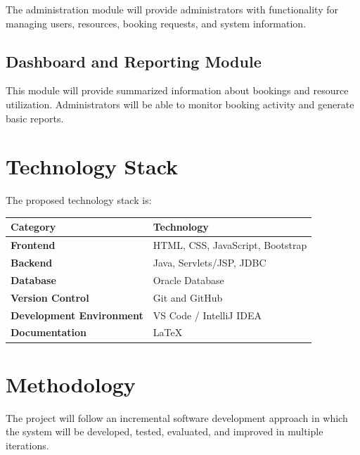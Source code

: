 \documentclass[12pt,a4paper]{article}
\begin{document}
The administration module will provide administrators with functionality for managing users, resources, booking requests, and system information.

\subsection{Dashboard and Reporting Module}

This module will provide summarized information about bookings and resource utilization. Administrators will be able to monitor booking activity and generate basic reports.



\section{Technology Stack}

The proposed technology stack is:

\begin{table}[h]
\centering
\renewcommand{\arraystretch}{1.3}
\begin{tabular}{>{\bfseries}p{4cm} p{8cm}}
\toprule
Category & Technology \\
\midrule
Frontend & HTML, CSS, JavaScript, Bootstrap \\
Backend & Java, Servlets/JSP, JDBC \\
Database & Oracle Database \\
Version Control & Git and GitHub \\
Development Environment & VS Code / IntelliJ IDEA \\
Documentation & LaTeX \\
\bottomrule
\end{tabular}
\end{table}



\section{Methodology}

The project will follow an incremental software development
approach in which the system will be developed, tested, evaluated,
and improved in multiple iterations.
\end{document}
